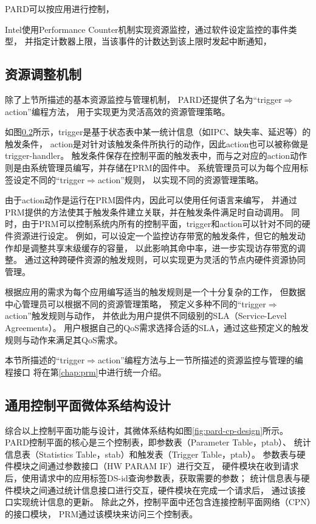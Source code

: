 PARD可以按应用进行控制，

Intel使用Performance Counter机制实现资源监控，通过软件设定监控的事件类型，
并指定计数器上限，当该事件的计数达到该上限时发起中断通知，


\subsection{资源调整机制}

除了上节所描述的基本资源监控与管理机制，
PARD还提供了名为``trigger$\Rightarrow$action''编程方法，
用于实现更为灵活高效的资源管理策略。

如图\ref{}所示，trigger是基于状态表中某一统计信息（如IPC、缺失率、延迟等）的触发条件，
action是对针对该触发条件所执行的动作，因此action也可以被称做是trigger-handler。
触发条件保存在控制平面的触发表中，而与之对应的action动作则是由系统管理员编写，并存储在PRM的固件中。
系统管理员可以为每个应用标签设定不同的``trigger$\Rightarrow$action''规则，
以实现不同的资源管理策略。

由于action动作是运行在PRM固件内，因此可以使用任何语言来编写，
并通过PRM提供的方法使其于触发条件建立关联，并在触发条件满足时自动调用。
同时，由于PRM可以控制系统内所有的控制平面，trigger和action可以针对不同的硬件资源进行设定。
例如，可以设定一个监控访存带宽的触发条件，但它的触发动作却是调整共享末级缓存的容量，
以此影响其命中率，进一步实现访存带宽的调整。
通过这种跨硬件资源的触发规则，可以实现更为灵活的节点内硬件资源协同管理。

根据应用的需求为每个应用编写适当的触发规则是一个十分复杂的工作，
但数据中心管理员可以根据不同的资源管理策略，
预定义多种不同的``trigger$\Rightarrow$action''触发规则与动作，
并依此为用户提供不同级别的SLA（Service-Level Agreements）。
用户根据自己的QoS需求选择合适的SLA，通过这些预定义的触发规则与动作来满足其QoS需求。

本节所描述的``trigger$\Rightarrow$action''编程方法与上一节所描述的资源监控与管理的编程接口
将在第\ref{chap:prm}中进行统一介绍。


\subsection{通用控制平面微体系结构设计}

综合以上控制平面功能与设计，其微体系结构如图\ref{fig:pard-cp-design}所示。
PARD控制平面的核心是三个控制表，即参数表（Parameter Table，ptab）、
统计信息表（Statistics Table，stab）和触发表（Trigger Table，ptab）。
参数表与硬件模块之间通过参数接口（HW PARAM IF）进行交互，
硬件模块在收到请求后，使用请求中的应用标签DS-id查询参数表，获取需要的参数；
统计信息表与硬件模块之间通过统计信息接口进行交互，硬件模块在完成一个请求后，
通过该接口实现统计信息的更新。
除此之外，控制平面中还包含连接控制平面网络（CPN）的接口模块，
PRM通过该模块来访问三个控制表。

